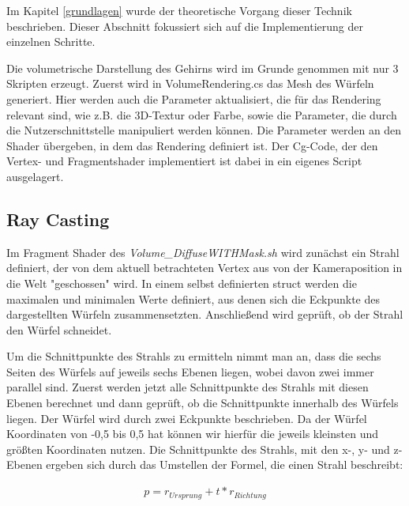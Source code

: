 Im Kapitel \ref{grundlagen} wurde der theoretische Vorgang dieser Technik beschrieben. Dieser Abschnitt fokussiert sich auf die Implementierung der einzelnen Schritte.

Die volumetrische Darstellung des Gehirns wird im Grunde genommen mit nur 3 Skripten erzeugt. Zuerst wird in VolumeRendering.cs das Mesh des Würfeln generiert. Hier werden auch die Parameter aktualisiert, die für das Rendering relevant sind, wie z.B. die 3D-Textur oder Farbe, sowie die Parameter, die durch die Nutzerschnittstelle manipuliert werden können. 
Die Parameter werden an den Shader übergeben, in dem das Rendering definiert ist. Der Cg-Code, der den Vertex- und Fragmentshader implementiert ist dabei in ein eigenes Script ausgelagert.

\subsection{Ray Casting}

Im Fragment Shader des \textit{Volume\_DiffuseWITHMask.sh} 
 wird zunächst ein Strahl definiert, der von dem aktuell betrachteten Vertex aus von der Kameraposition in die Welt "geschossen" wird. In einem selbst definierten struct werden die maximalen und minimalen Werte definiert, aus denen sich die Eckpunkte des dargestellten Würfeln zusammensetzten. Anschließend wird geprüft, ob der Strahl den Würfel schneidet. 

Um die Schnittpunkte des Strahls zu ermitteln nimmt man an, dass die sechs Seiten des Würfels auf jeweils sechs Ebenen liegen, wobei davon zwei immer parallel sind. Zuerst werden jetzt alle Schnittpunkte des Strahls mit diesen Ebenen berechnet und dann geprüft, ob die Schnittpunkte innerhalb des Würfels liegen.
Der Würfel wird durch zwei Eckpunkte beschrieben. Da der Würfel Koordinaten von -0,5 bis 0,5 hat können wir hierfür die jeweils kleinsten und größten Koordinaten nutzen. 
Die Schnittpunkte des Strahls, mit den x-, y- und z-Ebenen ergeben sich durch das Umstellen der Formel, die einen Strahl beschreibt:

\begin{align}
p=r_{Ursprung}+t*r_{Richtung}
\end{align}

